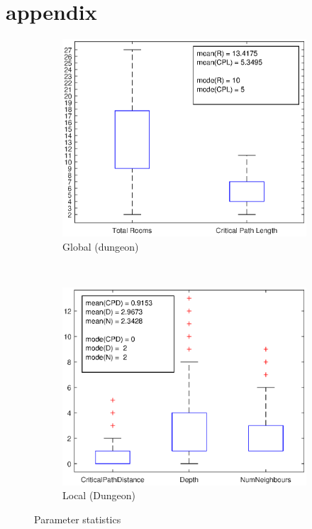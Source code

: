 \documentclass{UoYCSproject}
\begin{document}
\appendix
\chapter{appendix}
\label{cha:aA}

\begin{figure}[htb]
  \centering
  \begin{subfigure}[b]{0.45\textwidth}
    \centering
    \includegraphics[width=\textwidth]{figures/data_plots/dungeon_bp.eps}
    \caption{Global (dungeon)}
  \end{subfigure}
  ~
  \begin{subfigure}[b]{0.45\textwidth}
    \centering
    \includegraphics[width=\textwidth]{figures/data_plots/room_bp.eps}
    \caption{Local (Dungeon)}
  \end{subfigure}
  \caption{Parameter statistics}
  \label{fig:dataStats}
\end{figure}
\end{document}
